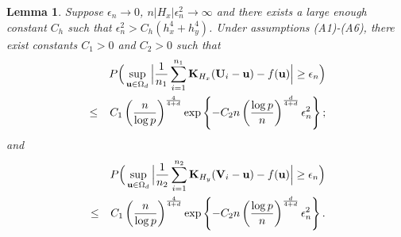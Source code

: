 \documentclass[11pt]{article}
\newtheorem{lem}{Lemma}
\theoremstyle{definition}
\begin{document}
 \begin{lem}\label{kernel}
 	Suppose $\epsilon_n\rightarrow 0$, $n|H_x|\epsilon_n^2\rightarrow \infty$ and there exists a large enough constant $C_h$ such that $\epsilon^2_n>C_h(h_x^4+h_y^4)$. Under assumptions (A1)-(A6), there exist constants $C_1>0$ and $C_2>0$ such that
 	\begin{eqnarray*}
 		&&P\Big(\sup_{{\bf u}\in \Omega_d}\Big|\frac{1}{n_1}\sum_{i=1}^{n_1}{\bf K}_{H_x}({\bf U}_i-{\bf u})-f({\bf u})\Big|\geq \epsilon_n\Big)\\
 		&\leq& C_1\left(\frac{n}{\log p}\right)^{\frac{4}{4+d}}\exp\left\{-C_2n \left(\frac{\log p}{n}\right)^{\frac{d}{4+d}}\epsilon_n^2\right\};
 	\end{eqnarray*}
 	and
 	\begin{eqnarray*}
 		&&P\Big(\sup_{{\bf u}\in \Omega_d}\Big|\frac{1}{n_2}\sum_{i=1}^{n_2}{\bf K}_{H_y}({\bf V}_i-{\bf u})-f({\bf u})\Big|\geq \epsilon_n\Big)\\
 		&\leq& C_1\left(\frac{n}{\log p}\right)^{\frac{4}{4+d}}\exp\left\{-C_2n \left(\frac{\log p}{n}\right)^{\frac{d}{4+d}}\epsilon_n^2\right\}.
 	\end{eqnarray*}
 \end{lem}
\end{document}
